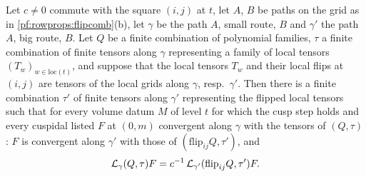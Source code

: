\begin{lemma}\label{pf:rowprops:oneflip}
Let $c\neq0$ commute with the square $(i,j)$ at $t$, let $A$, $B$ be paths on the grid as in
\cref{pf:rowprops:flipcomb}(b), let $\gamma$ be the path $A$, small route, $B$ and $\gamma'$ the path $A$, big route, $B$.
Let $Q$ be a finite combination of polynomial families, $\tau$ a finite combination of finite tensors along $\gamma$
representing a family of local tensors $(T_w)_{w\in\mathrm{loc}(t)}$, and suppose that the local tensors $T_w$ and their
local flips at $(i,j)$ are tensors of the local grids along $\gamma$, resp.\ $\gamma'$. Then there is a finite combination
$\tau'$ of finite tensors along $\gamma'$ representing the flipped local tensors such that for every volume datum $M$ of
level $t$ for which the cusp step holds and every cuspidal listed $F$ at $(0,m)$ convergent along $\gamma$ with the
tensors of $(Q,\tau)$: $F$ is convergent along $\gamma'$ with those of $(\mathrm{flip}_{ij}Q,\tau')$, and
\[
\mathcal{L}_\gamma(Q,\tau)F=c^{-1}\,\mathcal{L}_{\gamma'}(\mathrm{flip}_{ij}Q,\tau')F .
\]
\end{lemma}

